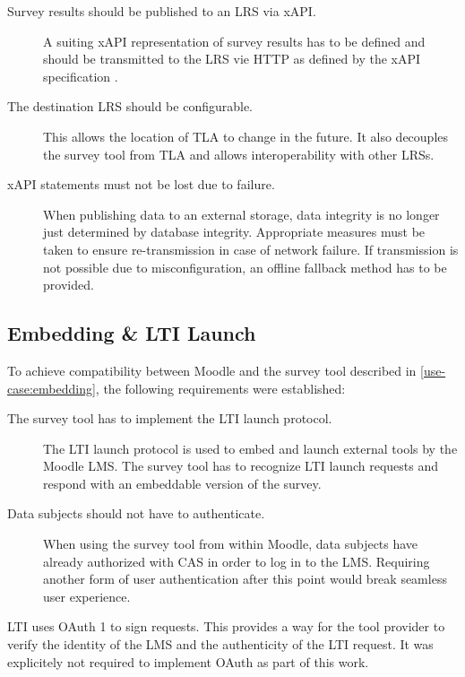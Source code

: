  \begin{description}
     \item[Survey results should be published to an LRS via xAPI.] A suiting xAPI 
     representation of survey results has to be defined and should be transmitted
     to the LRS vie HTTP as defined by the xAPI specification \cite{xapi-spec}.
     \item[The destination LRS should be configurable.] This allows the location
     of TLA to change in the future. It also decouples the survey tool from TLA 
     and allows interoperability with other LRSs.
     \item[xAPI statements must not be lost due to failure.] When publishing data
     to an external storage, data integrity is no longer just determined by
     database integrity. Appropriate measures must be taken to ensure 
     re-transmission in case of network failure. If transmission is not possible
     due to misconfiguration, an offline fallback method has to be provided.
 \end{description}

\subsection{Embedding \& LTI Launch}
 To achieve compatibility between Moodle and the survey tool described in \ref{use-case:embedding}, 
 the following requirements were established:

 \begin{description}
     \item[The survey tool has to implement the LTI launch protocol.] 
     The LTI launch protocol is used to embed and launch external tools 
     by the Moodle LMS. The survey tool has to recognize LTI launch requests
     and respond with an embeddable version of the survey.
     \item[Data subjects should not have to authenticate.] When using the survey tool
     from within Moodle, data subjects have already authorized with CAS in order
     to log in to the LMS. Requiring another form of user authentication after
     this point would break seamless user experience.
 \end{description}

 LTI uses OAuth 1 to sign requests. This provides a way for the tool provider
 to verify the identity of the LMS and the authenticity of the LTI request.
 It was explicitely not required to implement OAuth as part of this work.

